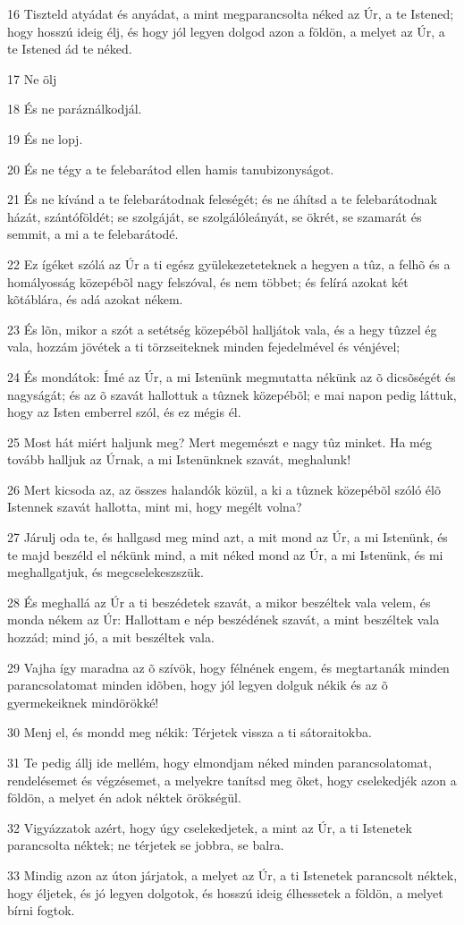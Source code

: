\par 16 Tiszteld atyádat és anyádat, a mint megparancsolta néked az Úr, a te Istened;  hogy hosszú ideig élj, és hogy jól legyen dolgod azon a földön, a melyet az Úr, a te Istened ád te néked.
\par 17 Ne ölj
\par 18 És ne paráználkodjál.
\par 19 És ne lopj.
\par 20 És ne tégy a te felebarátod ellen hamis tanubizonyságot.
\par 21 És ne kívánd a te felebarátodnak feleségét; és ne áhítsd a te felebarátodnak házát, szántóföldét; se szolgáját, se szolgálóleányát, se ökrét, se szamarát és semmit, a mi a te felebarátodé.
\par 22 Ez ígéket szólá az Úr a ti egész gyülekezeteteknek a hegyen a tûz, a felhõ és a homályosság közepébõl nagy felszóval, és nem többet; és felírá azokat két kõtáblára,  és adá azokat nékem.
\par 23 És lõn, mikor a szót a setétség közepébõl halljátok vala, és a hegy tûzzel ég vala, hozzám jövétek a ti törzseiteknek minden fejedelmével és vénjével;
\par 24 És mondátok: Ímé az Úr, a mi Istenünk megmutatta nékünk az õ dicsõségét és nagyságát; és az õ szavát hallottuk a tûznek közepébõl; e mai napon pedig láttuk, hogy az Isten emberrel szól, és ez mégis él.
\par 25 Most hát miért haljunk meg? Mert megemészt e nagy tûz minket. Ha még tovább halljuk az Úrnak, a mi Istenünknek szavát, meghalunk!
\par 26 Mert kicsoda az, az összes halandók közül, a ki a tûznek közepébõl szóló élõ Istennek szavát hallotta, mint mi, hogy megélt volna?
\par 27 Járulj oda te, és hallgasd meg mind azt, a mit mond az Úr, a mi Istenünk, és te majd beszéld el nékünk mind, a mit néked mond az Úr, a mi Istenünk, és mi meghallgatjuk, és megcselekeszszük.
\par 28 És meghallá az Úr a ti beszédetek szavát, a mikor beszéltek vala velem, és monda nékem az Úr: Hallottam e nép beszédének szavát, a mint beszéltek vala hozzád; mind jó, a mit beszéltek vala.
\par 29 Vajha így maradna az õ szívök, hogy félnének engem, és megtartanák minden parancsolatomat minden idõben, hogy jól legyen dolguk nékik és az õ gyermekeiknek mindörökké!
\par 30 Menj el, és mondd meg nékik: Térjetek vissza a ti sátoraitokba.
\par 31 Te pedig állj ide mellém, hogy elmondjam néked minden parancsolatomat, rendelésemet és végzésemet, a melyekre tanítsd meg õket, hogy cselekedjék azon a földön, a melyet én adok néktek örökségül.
\par 32 Vigyázzatok azért, hogy úgy cselekedjetek, a mint az Úr, a ti Istenetek parancsolta néktek; ne térjetek se jobbra, se balra.
\par 33 Mindig azon az úton járjatok, a melyet az Úr, a ti Istenetek parancsolt néktek, hogy éljetek, és jó legyen dolgotok, és hosszú ideig élhessetek a földön, a melyet bírni fogtok.

